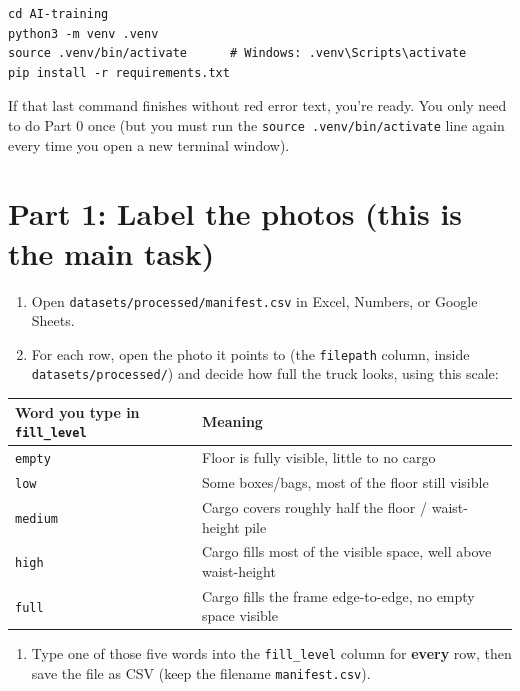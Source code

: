 \documentclass[11pt]{article}
\begin{document}
\begin{lstlisting}
cd AI-training
python3 -m venv .venv
source .venv/bin/activate      # Windows: .venv\Scripts\activate
pip install -r requirements.txt
\end{lstlisting}

If that last command finishes without red error text, you're ready. You
only need to do Part 0 once (but you must run the \texttt{source
.venv/bin/activate} line again every time you open a new terminal window).

\section*{Part 1: Label the photos (this is the main task)}
\begin{enumerate}
  \item Open \texttt{datasets/processed/manifest.csv} in Excel, Numbers, or Google Sheets.
  \item For each row, open the photo it points to (the \texttt{filepath} column, inside \texttt{datasets/processed/}) and decide how full the truck looks, using this scale:
\end{enumerate}

\begin{center}
\begin{tabular}{@{}ll@{}}
\toprule
\textbf{Word you type in \texttt{fill\_level}} & \textbf{Meaning} \\
\midrule
\texttt{empty}  & Floor is fully visible, little to no cargo \\
\texttt{low}    & Some boxes/bags, most of the floor still visible \\
\texttt{medium} & Cargo covers roughly half the floor / waist-height pile \\
\texttt{high}   & Cargo fills most of the visible space, well above waist-height \\
\texttt{full}   & Cargo fills the frame edge-to-edge, no empty space visible \\
\bottomrule
\end{tabular}
\end{center}

\begin{enumerate}[resume]
  \item Type one of those five words into the \texttt{fill\_level} column for \textbf{every} row, then save the file as CSV (keep the filename \texttt{manifest.csv}).
\end{enumerate}
\end{document}
